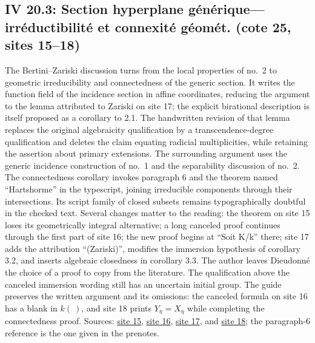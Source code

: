 \subsection*{IV 20.3: Section hyperplane générique---irréductibilité et connexité géomét. (cote 25, sites 15--18)}
The Bertini--Zariski discussion turns from the local properties of no.\ 2 to geometric irreducibility and connectedness of the generic section. It writes the function field of the incidence section in affine coordinates, reducing the argument to the lemma attributed to Zariski on site 17; the explicit birational description is itself proposed as a corollary to 2.1. The handwritten revision of that lemma replaces the original algebraicity qualification by a transcendence-degree qualification and deletes the claim equating radicial multiplicities, while retaining the assertion about primary extensions. The surrounding argument uses the generic incidence construction of no.\ 1 and the separability discussion of no.\ 2. The connectedness corollary invokes paragraph 6 and the theorem named ``Hartshorme'' in the typescript, joining irreducible components through their intersections. Its script family of closed subsets remains typographically doubtful in the checked text. Several changes matter to the reading: the theorem on site 15 loses its geometrically integral alternative; a long canceled proof continues through the first part of site 16; the new proof begins at ``Soit K/k'' there; site 17 adds the attribution ``(Zariski)'', modifies the immersion hypothesis of corollary 3.2, and inserts algebraic closedness in corollary 3.3. The author leaves Dieudonné the choice of a proof to copy from the literature. The qualification above the canceled immersion wording still has an uncertain initial group. The guide preserves the written argument and its omissions: the canceled formula on site 16 has a blank in $k(\ )$, and site 18 prints $Y_\eta=X_\eta$ while completing the connectedness proof. Sources: \href{https://grothendieck.umontpellier.fr/web/viewer.html?file=../25.pdf\#page=16}{site 15}, \href{https://grothendieck.umontpellier.fr/web/viewer.html?file=../25.pdf\#page=17}{site 16}, \href{https://grothendieck.umontpellier.fr/web/viewer.html?file=../25.pdf\#page=18}{site 17}, and \href{https://grothendieck.umontpellier.fr/web/viewer.html?file=../25.pdf\#page=19}{site 18}; the paragraph-6 reference is the one given in the prenotes.
